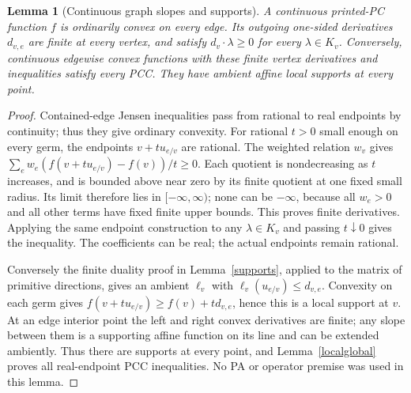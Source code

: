 \documentclass[11pt]{article}
\newtheorem{lemma}[theorem]{Lemma}
\begin{document}
\begin{lemma}[Continuous graph slopes and supports]\label{graph-slopes}
A continuous printed-PC function $f$ is ordinarily convex on every edge.
Its outgoing one-sided derivatives $d_{v,e}$ are finite at every vertex,
and satisfy $d_v\cdot\lambda\geq0$ for every $\lambda\in K_v$.
Conversely, continuous edgewise convex functions with these finite
vertex derivatives and inequalities satisfy every PCC. They have
ambient affine local supports at every point.
\end{lemma}
\begin{proof}
Contained-edge Jensen inequalities pass from rational to real endpoints
by continuity; thus they give ordinary convexity. For rational $t>0$
small enough on every germ, the endpoints $v+t u_{e/v}$ are rational.
The weighted relation $w_v$ gives
$\sum_e w_e(f(v+tu_{e/v})-f(v))/t\geq0$.
Each quotient is nondecreasing as $t$ increases, and is bounded above
near zero by its finite quotient at one fixed small radius. Its limit
therefore lies in $[-\infty,\infty)$; none can be $-\infty$, because
all $w_e>0$ and all other terms have fixed finite upper bounds.
This proves finite derivatives. Applying the same endpoint construction
to any $\lambda\in K_v$ and passing $t\downarrow0$ gives the inequality.
The coefficients can be real; the actual endpoints remain rational.

Conversely the finite duality proof in Lemma~\ref{supports}, applied
to the matrix of primitive directions, gives an ambient $\ell_v$ with
$\ell_v(u_{e/v})\leq d_{v,e}$. Convexity on each germ gives
$f(v+tu_{e/v})\geq f(v)+t d_{v,e}$, hence this is a local support
at $v$. At an edge interior point the left and right convex derivatives
are finite; any slope between them is a supporting affine function
on its line and can be extended ambiently. Thus there are supports at
every point, and Lemma~\ref{localglobal} proves all real-endpoint PCC
inequalities. No PA or operator premise was used in this lemma.
\end{proof}
\end{document}
